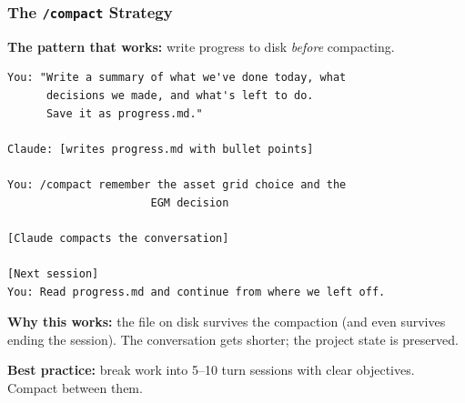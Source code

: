 \documentclass[10pt,english,aspectratio=169]{beamer}
\begin{document}
\begin{frame}[fragile]
\frametitle{The \texttt{/compact} Strategy}

\textbf{The pattern that works:} write progress to disk \textit{before} compacting.

\vspace{0.2cm}

\begin{lstlisting}[style=pythonstyle,language={},basicstyle=\ttfamily\scriptsize]
You: "Write a summary of what we've done today, what
      decisions we made, and what's left to do.
      Save it as progress.md."

Claude: [writes progress.md with bullet points]

You: /compact remember the asset grid choice and the
                      EGM decision

[Claude compacts the conversation]

[Next session]
You: Read progress.md and continue from where we left off.
\end{lstlisting}

\vspace{0.2cm}

\textbf{Why this works:} the file on disk survives the compaction (and even survives ending the session). The conversation gets shorter; the project state is preserved.

\textbf{Best practice:} break work into 5--10 turn sessions with clear objectives. Compact between them.
\end{frame}
\end{document}
